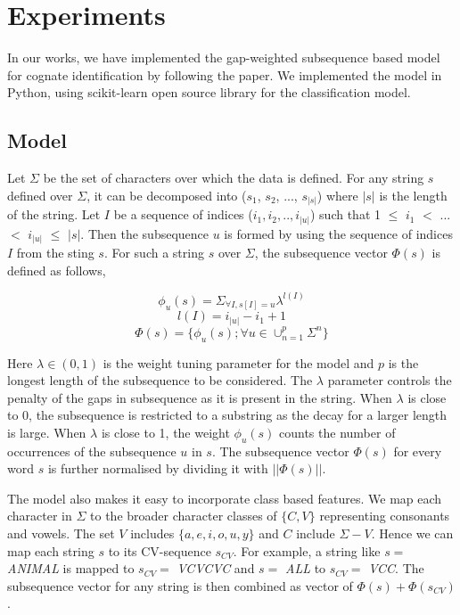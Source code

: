 \chapter{Experiments}

In our works, we have implemented the gap-weighted subsequence based model \cite{rama2015automatic} for cognate identification by following the paper. We implemented the model in Python, using scikit-learn \cite{scikit-learn} open source library for the classification model. 

\section{Model}

Let $\Sigma$ be the set of characters over which the data is defined. For any string $s$ defined over $\Sigma$, it can be decomposed into ($s_1$, $s_2$, ..., $s_{|s|}$) where $|s|$ is the length of the string. Let $I$ be a sequence of indices ($i_1, i_2, .., i_{|u|}$) such that 1 $\leq$ $i_1$ $<$ ... $<$ $i_{|u|}$ $\leq$ $|s|$. Then the subsequence $u$ is formed by using the sequence of indices $I$ from the sting $s$. For such a string $s$ over $\Sigma$, the subsequence vector $\Phi(s)$ is defined as follows,

\begin{equation}
\phi_u(s) = \Sigma_{\forall I, s[I] = u} \lambda^{l(I)}
\end{equation}
\begin{equation}
l(I) = i_{|u|} - i_1 + 1\end{equation}
\begin{equation}
\Phi(s) = \{\phi_u(s); \forall u \in \cup_{n=1}^p \Sigma^n\}
\end{equation}

Here $\lambda \in (0,1)$ is the weight tuning parameter for the model and $p$ is the longest length of the subsequence to be considered. The $\lambda$ parameter controls the penalty of the gaps in subsequence as it is present in the string. When $\lambda$ is close to 0, the subsequence is restricted to a substring as the decay for a larger length is large. When $\lambda$ is close to 1, the weight $\phi_u(s)$ counts the number of occurrences of the subsequence $u$ in $s$. The subsequence vector $\Phi(s)$ for every word $s$ is further normalised by dividing it with $||\Phi(s)||$. 

The model also makes it easy to incorporate class based features. We map each character in $\Sigma$ to the  broader character classes of $\{C, V\}$ representing consonants and vowels. The set $V$ includes $\{a, e, i, o, u, y\}$ and $C$ include $\Sigma - V$. Hence we can map each string $s$ to its CV-sequence $s_{CV}$. For example, a string like $s=$ \textit{ANIMAL} is mapped to $s_{CV}=$ \textit{VCVCVC} and $s=$ \textit{ALL} to $s_{CV}=$ \textit{VCC}. The subsequence vector for any string is then combined as vector of $\Phi(s) + \Phi(s_{CV})$. 

